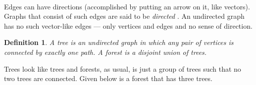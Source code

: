 \documentclass[a4paper, 12pt]{article}
\newtheorem*{definition}{Definition} %
\theoremstyle{remark} %
\begin{document}
\begin{center}
\\
\end{center}

	Edges can have directions (accomplished by putting an arrow on it, like vectors). Graphs that consist of such edges are said to be \textit{directed} . An undirected graph has no such vector-like edges --- only vertices and edges and no sense of direction. 

\begin{definition}
	A tree  is an undirected graph in which any pair of vertices is connected by exactly one path. A forest  is a disjoint union of trees.
\end{definition}

Trees look like trees and forests, as usual, is just a group of trees such that no two trees are connected. Given below is a forest that has three trees.\\
	
\end{document}
